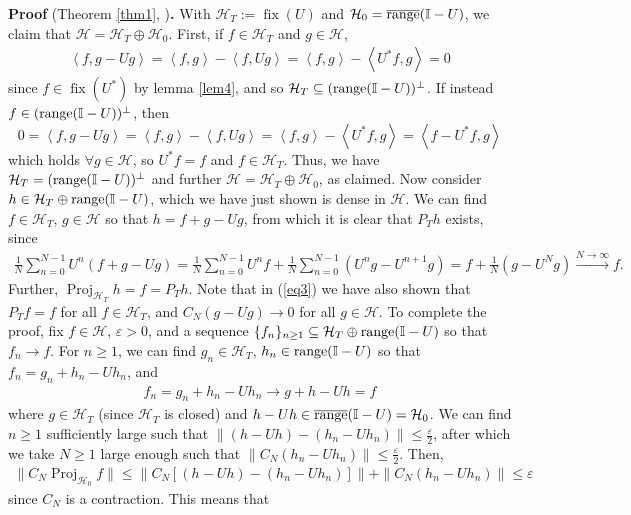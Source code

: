 \documentclass[11pt]{report}
\newcommand{\mc}[1]{\mathcal{#1}}
\newcommand{\ip}[2]{\left\langle#1,#2\right\rangle }
\newcommand{\1}[1]{\mathbbm{1}_{\{#1\}}}
\DeclareMathOperator{\fix}{fix}
\DeclareMathOperator{\ran}{range}
\DeclareMathOperator{\proj}{Proj}
\theoremstyle{definition}
\begin{document}
    \noindent\textbf{Proof} (Theorem \ref{thm1}, \cite[theorem 1.3.1]{Weber_2000})\textbf{.} With
    $\mc{H}_T:=\fix(U)$ and $\mc{H}_0=\overline{\ran}(\mbb{I}-U)$, we claim that
    $\mc{H}=\mc{H}_T\oplus\mc{H}_0$. First, if $f\in\mc{H}_T$ and $g\in\mc{H}$,
    \begin{align*}
        \ip{f}{g-Ug}=\ip{f}{g}-\ip{f}{Ug}=\ip{f}{g}-\ip{U^\ast f}{g}=0
    \end{align*}
    since $f\in\fix(U^\ast)$ by lemma \ref{lem4}, and so
    $\mc{H}_T\subseteq(\ran(\mbb{I}-U))^\perp$. If instead
    $f\in(\ran(\mbb{I}-U))^\perp$, then
    \[0=\ip{f}{g-Ug}=\ip{f}{g}-\ip{f}{Ug}=\ip{f}{g}-\ip{U^\ast
    f}{g}=\ip{f-U^\ast f}{g}\] which holds $\forall g\in\mc{H}$, so $U^\ast f=f$
    and $f\in\mc{H}_T$. Thus, we have $\mc{H}_T=(\ran(\mbb{I}-U))^\perp$ and
    further $\mc{H}=\mc{H}_T\oplus\mc{H}_0$, as claimed. Now consider
    $h\in\mc{H}_T\oplus \ran(\mbb{I}-U)$, which we have just shown is dense in
    $\mc{H}$. We can find $f\in\mc{H}_T$, $g\in\mc{H}$ so that $h=f+g-Ug$, from
    which it is clear that $P_Th$ exists, since
    \begin{align}
        \frac{1}{N}\sum_{n=0}^{N-1}U^n(f+g-Ug)=\frac{1}{N}\sum_{n=0}^{N-1}U^nf+\frac{1}{N}\sum_{n=0}^{N-1}(U^ng-U^{n+1}g)=f+\frac{1}{N}(g-U^Ng)\overset{N\rightarrow\infty}{\longrightarrow} f.\label{eq3}
    \end{align}
    Further, $\proj_{\mc{H}_T}h=f=P_Th$. Note that in (\ref{eq3}) we have also
    shown that $P_Tf=f$ for all $f\in\mc{H}_T$, and $C_N(g-Ug)\rightarrow 0$ for
    all $g\in\mc{H}$. To complete the proof, fix $f\in\mc{H}$, $\varepsilon>0$,
    and a sequence $\{f_n\}_{n\geq 1}\subseteq\mc{H}_T\oplus\ran(\mbb{I}-U)$ so
    that $f_n\rightarrow f$. For $n\geq 1$, we can find $g_n\in\mc{H}_T$,
    $h_n\in\ran(\mbb{I}-U)$ so that $f_n=g_n+h_n-Uh_n$, and 
    \begin{align*}
        f_n=g_n+h_n-Uh_n\longrightarrow g+h-Uh=f
    \end{align*}
    where $g\in\mc{H}_T$ (since $\mc{H}_T$ is closed) and
    $h-Uh\in\overline{\ran}(\mbb{I}-U)=\mc{H}_0$. We can find $n\geq 1$
    sufficiently large such that
    $\|(h-Uh)-(h_n-Uh_n)\|\leq\frac{\varepsilon}{2}$, after which we take $N\geq
    1$ large enough such that $\|C_N(h_n-Uh_n)\|\leq\frac{\varepsilon}{2}$.
    Then,
    \begin{align*}
        \|C_N\proj_{\mc{H}_0}f\|\leq\|C_N[(h-Uh)-(h_n-Uh_n)]\|+\|C_N(h_n-Uh_n)\|\leq \varepsilon
    \end{align*}
    since $C_N$ is a contraction. This means that
\end{document}

